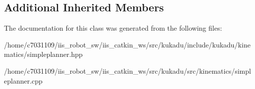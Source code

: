 \subsection*{Additional Inherited Members}


The documentation for this class was generated from the following files\-:\begin{DoxyCompactItemize}
\item 
/home/c7031109/iis\-\_\-robot\-\_\-sw/iis\-\_\-catkin\-\_\-ws/src/kukadu/include/kukadu/kinematics/simpleplanner.\-hpp\item 
/home/c7031109/iis\-\_\-robot\-\_\-sw/iis\-\_\-catkin\-\_\-ws/src/kukadu/src/kinematics/simpleplanner.\-cpp\end{DoxyCompactItemize}
